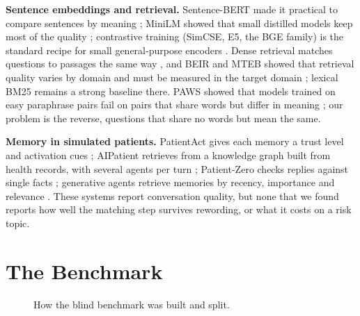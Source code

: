 \documentclass[sn-mathphys-num]{sn-jnl}
\begin{document}
\textbf{Sentence embeddings and retrieval.} Sentence-BERT made it practical to compare sentences by meaning \cite{reimers2019sentencebert};
MiniLM showed that small distilled models keep most of the quality \cite{wang2020minilm}; contrastive training (SimCSE, E5, the BGE family) is the
standard recipe for small general-purpose encoders \cite{gao2021simcse,wang2022e5,xiao2023cpack}. Dense retrieval matches questions to
passages the same way \cite{karpukhin2020dpr}, and BEIR and MTEB showed that retrieval quality varies by domain and must be measured in the
target domain \cite{thakur2021beir,muennighoff2022mteb}; lexical BM25 \cite{robertson2009bm25} remains a strong baseline there. PAWS showed that
models trained on easy paraphrase pairs fail on pairs that share words but differ in meaning \cite{zhang2019paws}; our problem is the reverse,
questions that share no words but mean the same.

\textbf{Memory in simulated patients.} PatientAct gives each memory a trust level and activation cues \cite{sabour2026patientact}; AIPatient
retrieves from a knowledge graph built from health records, with several agents per turn \cite{yu2024simulated}; Patient-Zero checks replies against
single facts \cite{lai2025patientzero}; generative agents retrieve memories by recency, importance and relevance \cite{park2023generative}. These
systems report conversation quality, but none that we found reports how well the matching step survives rewording, or what it costs on a risk
topic.

\section{The Benchmark}\label{sec:bench}

\begin{figure}[t]
\centering
{}
\caption{How the blind benchmark was built and split.}
\label{fig:bench}
\end{figure}
\end{document}
